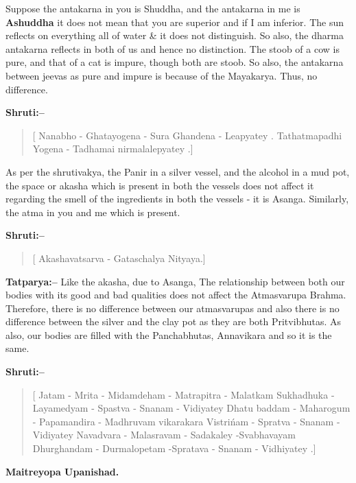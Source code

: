 Suppose the antakarna in you is Shuddha, and the antakarna in me is \textbf{Ashuddha} it does not mean that you are superior and if I am inferior. The sun reflects on everything all of water \& it does not distinguish. So also, the dharma antakarna reflects in both of us and hence no distinction. The stoob of a cow is pure, and that of a cat is impure, though both are stoob. So also, the antakarna between jeevas as pure and impure is because of the Mayakarya. Thus, no difference.

\textbf{Shruti:–}

\begin{verse}
[ Nanabho - Ghatayogena - Sura Ghandena - Leapya\break tey . Tathatmapadhi Yogena - Tadhamai nirmala\break lepyatey .]
\end{verse}

As per the shrutivakya, the Panir in a silver vessel, and the alcohol in a mud pot, the space or akasha which is present in both the vessels does not affect it regarding the smell of the ingredients in both the vessels - it is Asanga. Similarly, the atma in you and me which is present.

\textbf{Shruti:–}

\begin{verse}
[ Akashavatsarva - Gataschalya Nityaya.]
\end{verse}

\textbf{Tatparya:–} Like the akasha, due to Asanga, The relationship between both our bodies with its good and bad qualities does not affect the Atmasvarupa Brahma. Therefore, there is no difference between our atmasvarupas and also there is no difference between the silver and the clay pot as they are both Pritvibhutas. As also, our bodies are filled with the Panchabhutas, Annavikara and so it is the same.

\textbf{Shruti:–}

\begin{verse}
[ Jatam - Mrita - Midamdeham - Matrapitra - Malatkam  Sukhadhuka - Layamedyam - Spastva - Snanam - Vidiyatey  Dhatu baddam - Maharogum - Papamandira - Madhruvam  vikarakara Vistrińam - Spratva - Snanam - Vidiyatey  Navadvara - Malasravam - Sadakaley -\break Svabhavayam  Dhurghandam - Durmalopetam -\break Spratava - Snanam - Vidhiyatey .]
\end{verse}

\begin{flushright}
\textbf{Maitreyopa Upanishad.}
\end{flushright}

